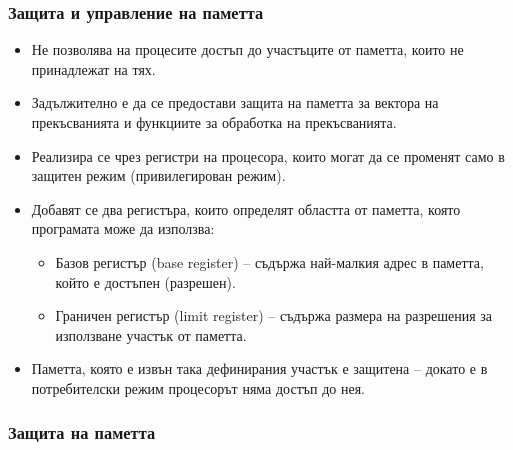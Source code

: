 \documentclass[ignorenonframetext, hyperref=unicode]{beamer}
\begin{document}
\begin{frame}
\frametitle{Защита и управление на паметта}
\begin{itemize}
\item Не позволява на процесите достъп до участъците от паметта, които не
принадлежат на тях.
\item Задължително е да се предостави защита на паметта за вектора на
прекъсванията и функциите за обработка на прекъсванията.
\item Реализира се чрез регистри на процесора, които могат да се променят
    само в защитен режим (привилегирован режим).
\item Добавят се два регистъра, които определят областта от паметта, която
програмата може да използва:
\begin{itemize}
  \item Базов регистър (base register) -- съдържа най-малкия адрес в паметта,
  който е достъпен (разрешен).
  \item Граничен регистър (limit register) -- съдържа размера на разрешения за
  използване участък от паметта.
\end{itemize}
\item Паметта, която е извън така дефинирания участък е защитена -- докато е в
потребителски режим процесорът няма достъп до нея.
\end{itemize}
\end{frame}

\begin{frame}
\frametitle{Защита на паметта}
\begin{figure}[h]
\center
{}
\end{figure}
\end{frame}
\end{document}

